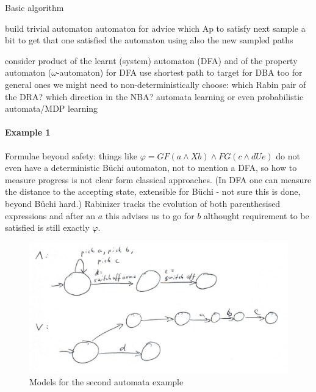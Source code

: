\documentclass{article}
\begin{document}
\begin{algorithm}
	\caption{Basic algorithm}\label{alg:general}
	\begin{algorithmic}[1]
		\State build trivial automaton
		\Repeat{}
		\Repeat{}
		\State {} automaton for advice which Ap to satisfy next
		\State sample a bit to get that one satisfied
		\State {} the automaton using also the new sampled paths
		
		\State consider product of the learnt (system) automaton (DFA) and of the property automaton ($\omega$-automaton)
		\State for DFA use shortest path to target
		\State for DBA too
		\State for general ones we might need to non-deterministically choose: which Rabin pair of the DRA? which direction in the NBA?
		\EndProcedure
		\State automata learning or even probabilistic automata/MDP learning
		\EndProcedure
	\end{algorithmic}
\end{algorithm}

\paragraph{Example 1}
Formulae beyond safety: things like $\varphi=GF(a\wedge Xb)\wedge FG(c\wedge dUe)$ do not even have a deterministic B\"uchi automaton, not to mention a DFA, so how to measure progress is not clear form classical approaches. 
(In DFA one can measure the distance to the accepting state, extensible for B\"uchi - not sure this is done, beyond B\"uchi hard.)
Rabinizer tracks the evolution of both parenthesised expressions and after an $a$ this advises us to go for $b$ althought requirement to be satisfied is still exactly $\varphi$.

\begin{figure}[h]
	\includegraphics[scale=0.4]{auto}\caption{Models for the second automata example}
\end{figure}
\end{document}
